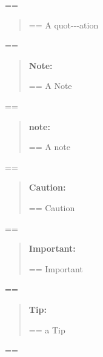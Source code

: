\documentclass{book}
\makeatletter
\newenvironment{Texinfopreformatted}{%
  \par\GNUTobeylines\obeyspaces\frenchspacing\parskip=\z@\parindent=\z@}{}
{\catcode`\^^M=13 \gdef\GNUTobeylines{\catcode`\^^M=13 \def^^M{\null\par}}}
\newenvironment{Texinfoindented}{\begin{list}{}{}\item\relax}{\end{list}}
\renewcommand{\_}{\Texinfounderscore\discretionary{}{}{}}
\makeatother
\begin{document}
{{\begin{Texinfoindented}
\begin{Texinfoindented}
\end{Texinfoindented}
\begin{Texinfopreformatted}%
\ttfamily 
\end{Texinfopreformatted}
\begin{quote}
\begin{Texinfopreformatted}%
\ttfamily A quot{-}{-}{-}ation
\end{Texinfopreformatted}
\end{quote}
\begin{Texinfopreformatted}%
\ttfamily 
\end{Texinfopreformatted}
\begin{quote}
\textbf{Note:} \begin{Texinfopreformatted}%
\ttfamily A Note
\end{Texinfopreformatted}
\end{quote}
\begin{Texinfopreformatted}%
\ttfamily 
\end{Texinfopreformatted}
\begin{quote}
\textbf{note:} \begin{Texinfopreformatted}%
\ttfamily A note
\end{Texinfopreformatted}
\end{quote}
\begin{Texinfopreformatted}%
\ttfamily 
\end{Texinfopreformatted}
\begin{quote}
\textbf{Caution:} \begin{Texinfopreformatted}%
\ttfamily Caution
\end{Texinfopreformatted}
\end{quote}
\begin{Texinfopreformatted}%
\ttfamily 
\end{Texinfopreformatted}
\begin{quote}
\textbf{Important:} \begin{Texinfopreformatted}%
\ttfamily Important
\end{Texinfopreformatted}
\end{quote}
\begin{Texinfopreformatted}%
\ttfamily 
\end{Texinfopreformatted}
\begin{quote}
\textbf{Tip:} \begin{Texinfopreformatted}%
\ttfamily a Tip
\end{Texinfopreformatted}
\end{quote}
\begin{Texinfopreformatted}%

\end{Texinfopreformatted}
\end{Texinfoindented}}}
\end{document}

